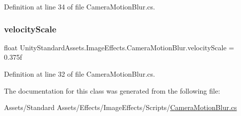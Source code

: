 Definition at line 34 of file Camera\+Motion\+Blur.\+cs.

\mbox{\label{class_unity_standard_assets_1_1_image_effects_1_1_camera_motion_blur_a3345ffe10e8c75ba91387badf041f343}} 
\subsubsection{\texorpdfstring{velocity\+Scale}{velocityScale}}
{\footnotesize\ttfamily float Unity\+Standard\+Assets.\+Image\+Effects.\+Camera\+Motion\+Blur.\+velocity\+Scale = 0.\+375f}



Definition at line 32 of file Camera\+Motion\+Blur.\+cs.



The documentation for this class was generated from the following file\+:\begin{DoxyCompactItemize}
\item 
Assets/\+Standard Assets/\+Effects/\+Image\+Effects/\+Scripts/\mbox{\hyperlink{_camera_motion_blur_8cs}{Camera\+Motion\+Blur.\+cs}}\end{DoxyCompactItemize}
